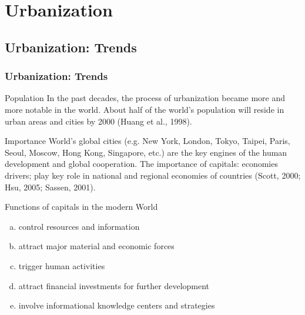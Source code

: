 \documentclass[pdflatex,compress,8pt,
	xcolor={dvipsnames,dvipsnames,svgnames,x11names,table},
	hyperref={	
	breaklinks = true, 
	pdfauthor={Lemenkova Polina}, 
	pdfsubject={Preentation}, 
	pdfcreator={Lemenkova Polina}, 
	pdfproducer={Lemenkova Polina}, 
	colorlinks=true,
	linkcolor=Gold1, 
	citecolor=NavyBlue, 
	urlcolor = NavyBlue, 
	breaklinks = true}]{beamer}
\begin{document}
\section{Urbanization}

\subsection{Urbanization: Trends}
\begin{frame}\frametitle{Urbanization: Trends}

\begin{alertblock}{Population}
In the past decades, the process of urbanization became more and more notable in the world. About half of the world's population will reside in urban areas and cities by 2000 (Huang et al., 1998).
\end{alertblock}

\begin{block}{Importance}
World's global cities (e.g. New York, London, Tokyo, Taipei, Paris, Seoul, Moscow, Hong Kong, Singapore, etc.) are the key engines of the human development and global cooperation. The importance of capitals: economies drivers; play key role in national and regional economies of countries (Scott, 2000; Hsu, 2005; Sassen, 2001).
\end{block}

\begin{examples}{Functions of capitals in the modern World}
\begin{enumerate}[(a)]
	\item control resources and information
	\item attract major material and economic forces
	\item trigger human activities
	\item attract financial investments for further development
	\item involve informational knowledge centers and strategies
\end{enumerate}
\end{examples}
\end{frame}
\end{document}

